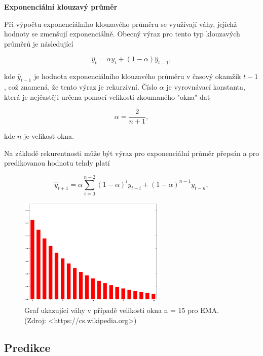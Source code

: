 \documentclass[a4paper,12pt,twoside]{scrreprt}
\begin{document}
\normalsize \textbf{Exponenciální klouzavý průměr}

Při výpočtu exponenciálního klouzavého průměru se využívají váhy, jejichž hodnoty se zmenšují exponenciálně. Obecný výraz pro tento typ klouzavých průměrů je následující 

\begin{equation}
\hat{y}_{t} = \alpha{y}_t + (1-\alpha)\hat{y}_{t-1}, 
\end{equation}  

kde $\hat{y}_{t-1}$ je hodnota exponenciálního klouzavého průměru v časový okamžik $t-1$, což znamená, že tento výraz je rekurzivní. Číslo $\alpha$ je vyrovnávací konstanta, která je nejčastěji určena pomocí velikosti zkoumaného "okna" \space dat

\begin{equation}
\alpha = \frac{2}{n+1}, 
\end{equation}  

kde $n$ je velikost okna.

Na základě rekurentnosti může být výraz pro exponenciální průměr přepsán a pro predikovanou hodnotu tehdy platí 

\begin{equation}
\hat{y}_{t+1} = \alpha\sum_{i=0}^{n-2}(1-\alpha)^iy_{t-i} + (1-\alpha)^{n-1}y_{t-n},
\end{equation}

\begin{figure}[h]
  \centering
  \includegraphics[width=7cm]{pictures/exponentialMAweights.png}
  \caption{Graf ukazující váhy v případě velikosti okna n = 15 pro EMA. \newline(Zdroj: <https://cs.wikipedia.org>)}
  \label{fig:exponentialWeights}
\end{figure}

\subsection{Predikce}
\end{document}

